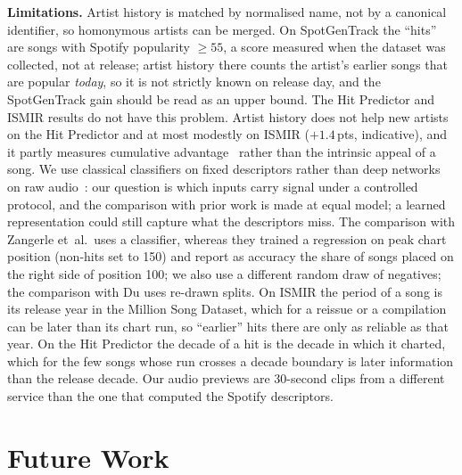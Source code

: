 \documentclass[conference]{IEEEtran}
\newcommand{\pp}{\,pts}
\begin{document}
\textbf{Limitations.} Artist history is matched by normalised name, not by a canonical
identifier, so homonymous artists can be merged. On SpotGenTrack the ``hits'' are songs with Spotify popularity
$\geq55$, a score measured when the dataset was collected, not at release; artist history there counts
the artist's earlier songs that are popular \emph{today}, so it is not strictly known on release day, and the
SpotGenTrack gain should be read as an upper bound. The Hit Predictor and ISMIR results do not have this problem. Artist history does not help new artists on
the Hit Predictor and at most modestly on ISMIR ($+1.4$\pp, indicative), and it partly measures
cumulative advantage~\cite{salganik2006experimental} rather than the intrinsic appeal
of a song. We use classical classifiers on fixed descriptors rather than deep networks on
raw audio~\cite{yang2017revisiting,nofer2026deephits}: our question is which inputs carry
signal under a controlled protocol, and the comparison with prior work is made at equal
model; a learned representation could still capture what the descriptors miss. The
comparison with Zangerle et~al.\ uses a classifier, whereas they trained a regression on peak chart position
(non-hits set to 150) and report as accuracy the share of songs placed on the right side of position 100; we
also use a different random draw of negatives; the comparison with Du uses re-drawn
splits. On ISMIR the period of a song is its release year in the Million Song Dataset, which for a reissue or a
compilation can be later than its chart run, so ``earlier'' hits there are only as reliable as that year. On the
Hit Predictor the decade of a hit is the decade in which it charted, which for the few songs whose run crosses a
decade boundary is later information than the release decade. Our audio
previews are 30-second clips from a different service than the one that
computed the Spotify descriptors.

\section{Future Work}
\end{document}
